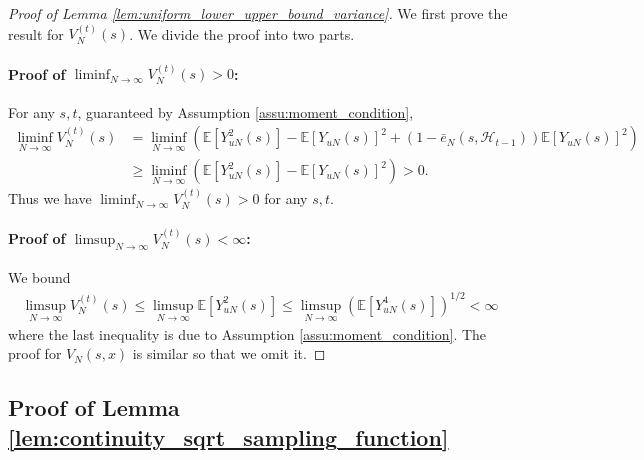 \documentclass[12pt]{article}
\newcommand{\E}{\mathbb E}								%
\begin{document}
\begin{proof}[Proof of Lemma \ref{lem:uniform_lower_upper_bound_variance}]
	We first prove the result for $V_N^{(t)}(s)$. We divide the proof into two parts.

	\paragraph{Proof of $\liminf_{N\rightarrow\infty}V_N^{(t)}(s)>0$:}
	For any $s,t$, guaranteed by Assumption \ref{assu:moment_condition},
	\begin{align*}
		\liminf_{N\rightarrow\infty}V_{N}^{(t)}(s)
		&
		=\liminf_{N\rightarrow\infty}\left(\E[Y_{uN}^2(s)]-\E[Y_{uN}(s)]^2+(1-\bar e_N(s,\mathcal{H}_{t-1}))\E[Y_{uN}(s)]^2\right)\\
		&
		\geq \liminf_{N\rightarrow\infty}\left(\E[Y_{uN}^2(s)]-\E[Y_{uN}(s)]^2\right)>0.
	\end{align*}
	Thus we have $\liminf_{N\rightarrow\infty}V_{N}^{(t)}(s)>0$ for any $s,t$. 

	\paragraph{Proof of $\limsup_{N\rightarrow\infty}V_N^{(t)}(s)<\infty$:}

	We bound 
	\begin{align*}
		\limsup_{N\rightarrow\infty}V_{N}^{(t)}(s)\leq \limsup_{N\rightarrow\infty}\E[Y_{uN}^2(s)]\leq\limsup_{N\rightarrow\infty}(\E[Y_{uN}^4(s)])^{1/2} <\infty
	\end{align*}
	where the last inequality is due to Assumption \ref{assu:moment_condition}. The proof for $V_N(s,x)$ is similar so that we omit it.
\end{proof}

\subsection{Proof of Lemma \ref{lem:continuity_sqrt_sampling_function}}\label{sec:proof_lem:continuity_sqrt_sampling_function}
\end{document}

